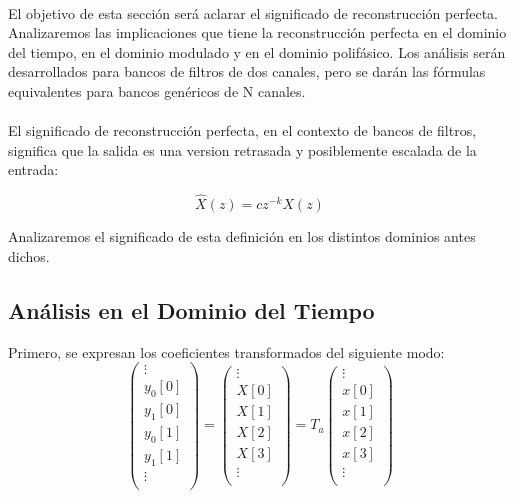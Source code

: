 \paragraph{}
El objetivo de esta sección será aclarar el significado de reconstrucción perfecta. Analizaremos las implicaciones que tiene la reconstrucción perfecta en el dominio del tiempo, en el dominio modulado y en el dominio polifásico. Los análisis serán desarrollados para bancos de filtros de dos canales, pero se darán las fórmulas equivalentes para bancos genéricos de N canales.
\paragraph{}
El significado de reconstrucción perfecta, en el contexto de bancos de filtros, significa que la salida es una version retrasada y posiblemente escalada de la entrada:

\begin{equation}
	\hat{X}(z) = c z^{-k} X(z)
	\label{eq:recons_perf}
\end{equation}

Analizaremos el significado de esta definición en los distintos dominios antes dichos.

\subsection{Análisis en el Dominio del Tiempo}


Primero, se expresan los coeficientes transformados del siguiente modo:
	\begin{equation}
		\begin{pmatrix}
			\vdots \\
			y_0[0] \\
			y_1[0] \\
			y_0[1] \\
			y_1[1] \\
			\vdots \\
		\end{pmatrix}
		=
		\begin{pmatrix}
			\vdots \\
			X[0] \\
			X[1] \\
			X[2] \\
			X[3] \\
			\vdots \\
		\end{pmatrix}
		= T_a 
		\begin{pmatrix}
			\vdots \\
			x[0] \\
			x[1] \\
			x[2] \\
			x[3] \\
			\vdots \\
		\end{pmatrix}
	\end{equation}

